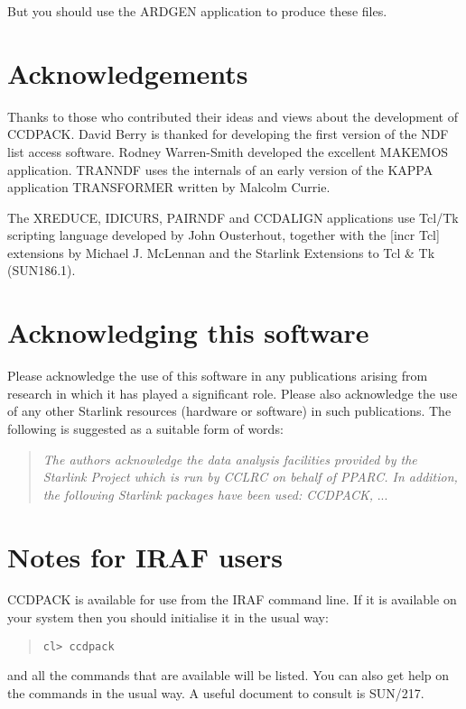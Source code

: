 \documentclass[twoside,11pt]{article}
\newcommand{\htmladdnormallink}[2]{#1}
\newcommand{\htmlref}[2]{#1}
\newcommand{\xref}[3]{#1}
\newcommand{\xlabel}[1]{}
\renewcommand{\_}{\texttt{\symbol{95}}}
\newcommand{\xroutine}[1]{\htmlref{{\sc #1}}{#1}}
\begin{document}
But you should use the \xref{ARDGEN}{sun95}{ARDGEN} application to
produce these files.

\section{Acknowledgements}

Thanks to those who contributed their ideas and views about the
development of CCDPACK. David Berry is thanked for developing the
first version of the NDF list access software. Rodney Warren-Smith
developed the excellent \xroutine{MAKEMOS}
application. \xroutine{TRANNDF} uses the internals of an early version
of the KAPPA application \xref{TRANSFORMER}{sun95}{TRANSFORMER}
written by Malcolm Currie.

The \xroutine{XREDUCE}, \xroutine{IDICURS}, \xroutine{PAIRNDF} and
\xroutine{CCDALIGN}  applications use
\htmladdnormallink{Tcl/Tk}{http://www.scriptics.com/}
scripting language developed by John Ousterhout, together with the
\htmladdnormallink{[incr Tcl]}{http://www.tcltk.com/itcl} extensions
by Michael J. McLennan and the
\xref{Starlink Extensions to Tcl \& Tk}{sun186}{} (SUN186.1).

\section{Acknowledging this software}
Please acknowledge the use of this software in any publications arising
from research in which it has played a significant role. Please also
acknowledge the use of any other Starlink resources (hardware or
software) in such publications. The following is suggested as a suitable
form of words:

\begin{center}
\begin{quote}
\emph{The authors acknowledge the data analysis facilities provided by
the Starlink Project which is run by CCLRC on behalf of PPARC. In
addition, the following Starlink packages have been used: CCDPACK,} ...
\end{quote}
\end{center}

\newpage
\appendix
\section{Notes for IRAF users \xlabel{IRAFNOTES} \label{IRAFNOTES} }

CCDPACK is available for use from the IRAF command line. If it is
available on your system then you should initialise it in the usual
way:
\begin{quote}
\begin{verbatim}
cl> ccdpack
\end{verbatim}
\end{quote}
and all the commands that are available will be listed. You can also
get help on the commands in the usual way. A useful document to
consult is \xref{SUN/217}{sun217}{}.
\end{document}
